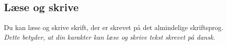 \subsection*{Læse og skrive}
Du kan læse og skrive skrift, der er skrevet på det almindelige skriftsprog.\\
\textit{Dette betyder, at din karakter kan læse og skrive tekst skrevet på dansk.}\\